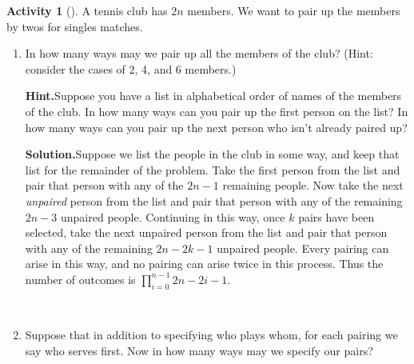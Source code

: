 \documentclass[10pt,]{book}
\theoremstyle{plain}
\theoremstyle{definition}
\newtheorem{activity}[project]{Activity}
\numberwithin{equation}{chapter}
\begin{document}
\begin{activity}[]\label{tennispairings1}
A tennis club has \(2n\) members. We want to pair up the members by twos for singles matches.%
~\par
\begin{enumerate}[label=(\alph*)]
 \item In how many ways may we pair up all the members of the club? (Hint: consider the cases of 2, 4, and 6 members.)%
\par\medskip\noindent%
\textbf{Hint.}\quad Suppose you have a list in alphabetical order of names of the members of the club. In how many ways can you pair up the first person on the list? In how many ways can you pair up the next person who isn’t already paired up?%
\par\medskip\noindent%
\textbf{Solution.}\quad Suppose we list the people in the club in some way, and keep that list for the remainder of the problem. Take the first person from the list and pair that person with any of the \(2n-1\) remaining people. Now take the next \emph{unpaired} person from the list and pair that person with any of the remaining \(2n-3\) unpaired people. Continuing in this way, once \(k\) pairs have been selected, take the next unpaired person from the list and pair that person with any of the remaining \(2n-2k-1\) unpaired people. Every pairing can arise in this way, and no pairing can arise twice in this process. Thus the number of outcomes is \(\prod_{i=0}^{n-1} 2n-2i-1\).%

~\par
\item Suppose that in addition to specifying who plays whom, for each pairing we say who serves first.  Now in how many ways may we specify our pairs?%

\end{enumerate}
\end{activity}
\end{document}
